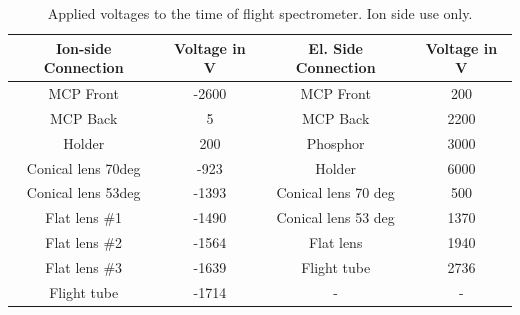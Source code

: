 \begin{table}
\centering
\begin{tabular}{ | c | c || c | c | }
\hline
	\textbf{Ion-side Connection} & \textbf{Voltage in V} & \textbf{El. Side Connection} & \textbf{Voltage in V} \\ \hline
	MCP Front & -2600 & MCP Front & 200 \\ \hline
	MCP Back & 5 & MCP Back & 2200 \\ \hline
	Holder & 200 & Phosphor & 3000 \\ \hline
	Conical lens 70deg & -923 & Holder & 6000 \\ \hline
	Conical lens 53deg & -1393 & Conical lens 70 deg & 500 \\ \hline
	Flat lens \#1 & -1490 & Conical lens 53 deg & 1370 \\ \hline
	Flat lens \#2 & -1564 & Flat lens & 1940 \\ \hline
	Flat lens \#3 & -1639 & Flight tube & 2736 \\ \hline
	Flight tube & -1714 & - & - \\ \hline
\end{tabular}
\caption{Applied voltages to the time of flight spectrometer. Ion side use only.}
\label{tab:tof-volategs}
\end{table}
%
%
%